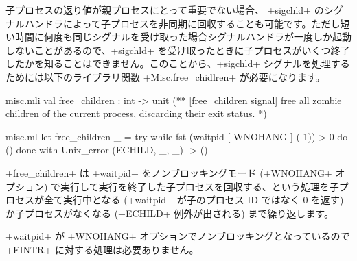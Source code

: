 \begin{example}\label{ex/childs}
子プロセスの返り値が親プロセスにとって重要でない場合、 \ml+sigchld+ のシグナルハンドラによって子プロセスを非同期に回収することも可能です。ただし短い時間に何度も同じシグナルを受け取った場合シグナルハンドラが一度しか起動しないことがあるので、\ml+sigchld+ を受け取ったときに子プロセスがいくつ終了したかを知ることはできません。このことから、\ml+sigchld+ シグナルを処理するためには以下のライブラリ関数 \ml+Misc.free_chidlren+ が必要になります。
%
\begin{codefile}{misc.mli}
val free_children : int -> unit
(** [free_children signal] free all zombie children of the current process,
    discarding their exit status. *)
\end{codefile}
%
\begin{listingcodefile}{misc.ml}
let free_children _ =
  try while fst (waitpid [ WNOHANG ] (-1)) > 0 do () done
  with Unix_error (ECHILD, _, _) -> ()
\end{listingcodefile}
%
\ml+free_children+ は \ml+waitpid+ をノンブロッキングモード (\ml+WNOHANG+ オプション) で実行して実行を終了した子プロセスを回収する、という処理を子プロセスが全て実行中となる (\ml+waitpid+ が子のプロセス ID ではなく 0 を返す) か子プロセスがなくなる (\ml+ECHILD+ 例外が出される) まで繰り返します。

\ml+waitpid+ が \ml+WNOHANG+ オプションでノンブロッキングとなっているので \ml+EINTR+ に対する処理は必要ありません。
\end{example}

